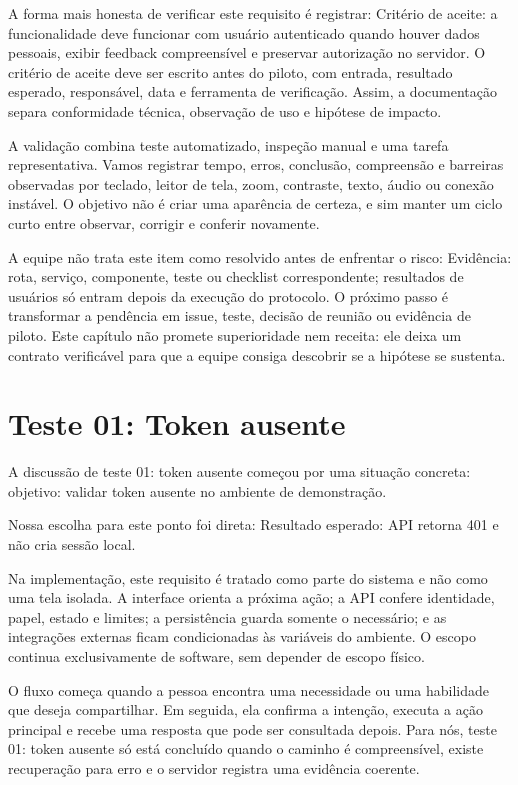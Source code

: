 \documentclass[12pt,oneside,a4paper,article]{abntex2}
\begin{document}
A forma mais honesta de verificar este requisito é registrar: Critério de aceite: a funcionalidade deve funcionar com usuário autenticado quando houver dados pessoais, exibir feedback compreensível e preservar autorização no servidor. O critério de aceite deve ser escrito antes do piloto, com entrada, resultado esperado, responsável, data e ferramenta de verificação. Assim, a documentação separa conformidade técnica, observação de uso e hipótese de impacto.

A validação combina teste automatizado, inspeção manual e uma tarefa representativa. Vamos registrar tempo, erros, conclusão, compreensão e barreiras observadas por teclado, leitor de tela, zoom, contraste, texto, áudio ou conexão instável. O objetivo não é criar uma aparência de certeza, e sim manter um ciclo curto entre observar, corrigir e conferir novamente.

A equipe não trata este item como resolvido antes de enfrentar o risco: Evidência: rota, serviço, componente, teste ou checklist correspondente; resultados de usuários só entram depois da execução do protocolo. O próximo passo é transformar a pendência em issue, teste, decisão de reunião ou evidência de piloto. Este capítulo não promete superioridade nem receita: ele deixa um contrato verificável para que a equipe consiga descobrir se a hipótese se sustenta.

\section{Teste 01: Token ausente}
A discussão de teste 01: token ausente começou por uma situação concreta: objetivo: validar token ausente no ambiente de demonstração.

Nossa escolha para este ponto foi direta: Resultado esperado: API retorna 401 e não cria sessão local.

Na implementação, este requisito é tratado como parte do sistema e não como uma tela isolada. A interface orienta a próxima ação; a API confere identidade, papel, estado e limites; a persistência guarda somente o necessário; e as integrações externas ficam condicionadas às variáveis do ambiente. O escopo continua exclusivamente de software, sem depender de escopo físico.

O fluxo começa quando a pessoa encontra uma necessidade ou uma habilidade que deseja compartilhar. Em seguida, ela confirma a intenção, executa a ação principal e recebe uma resposta que pode ser consultada depois. Para nós, teste 01: token ausente só está concluído quando o caminho é compreensível, existe recuperação para erro e o servidor registra uma evidência coerente.
\end{document}
